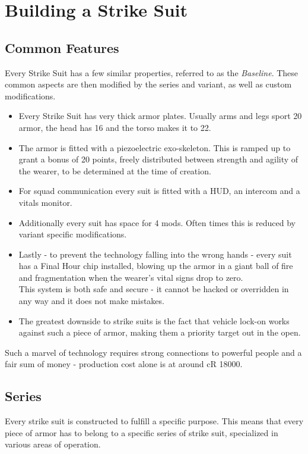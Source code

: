 \documentclass[12pt,a4paper,openany,usenames,dvipsnames]{book}
\begin{document}
	\chapter{Building a Strike Suit}
	\label{ch:building}
	\section{Common Features}
	Every Strike Suit has a few similar properties, referred to as the \emph{Baseline}.
	These common aspects are then modified by the series and variant,
	as well as custom modifications.
	\par%
	\vspace{-3mm} %
	\begin{itemize}
		\setlength\itemsep{-5mm}
		\item Every Strike Suit has very thick armor plates. Usually arms and legs sport 20 armor, the head has 16 and the torso makes it to 22.
		\item The armor is fitted with a piezoelectric exo-skeleton. This is ramped up to grant a bonus of 20 points, freely distributed between strength and agility of the wearer, to be determined at the time of creation.
		\item For squad communication every suit is fitted with a HUD, an intercom and a vitals monitor.
		\item Additionally every suit has space for 4 mods. Often times this is reduced by variant specific modifications.
		\item Lastly - to prevent the technology falling into the wrong hands - every suit has a Final Hour chip installed, blowing up the armor in a giant ball of fire and fragmentation when the wearer's vital signs drop to zero.\\
		This system is both safe and secure - it cannot be hacked or overridden in any way and it does not make mistakes.
		\item The greatest downside to strike suits is the fact that vehicle lock-on works against such a piece of armor, making them a priority target out in the open.
	\end{itemize}
	\par
	Such a marvel of technology requires strong connections to powerful people and a fair sum of money - production cost alone is at around cR 18000.

	\section{Series}
	Every strike suit is constructed to fulfill a specific purpose. This means that every piece of armor has to belong to a specific series of strike suit, specialized in various areas of operation.
	
\end{document}
